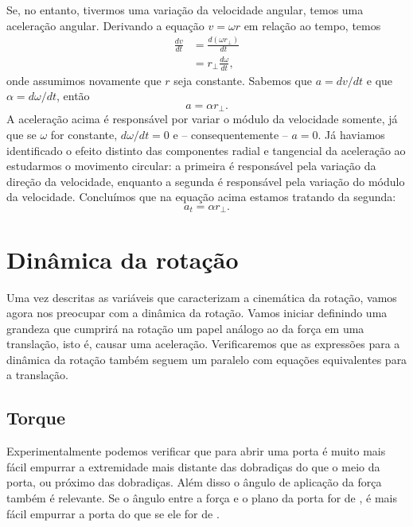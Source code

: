 Se, no entanto, tivermos uma variação da velocidade angular, temos uma aceleração angular. Derivando a equação $v = \omega r$ em relação ao tempo, temos
\begin{align}
	\frac{dv}{dt} &= \frac{d(\omega r_\perp)}{dt} \\
	&=r_\perp \frac{d\omega}{dt},
\end{align}
%
onde assumimos novamente que $r$ seja constante. Sabemos que $a=dv/dt$ e que $\alpha = d\omega/dt$, então
\begin{equation}
	a = \alpha r_\perp.
\end{equation}
%
A aceleração acima é responsável por variar o módulo da velocidade somente, já que se $\omega$ for constante, $d\omega/dt = 0$ e -- consequentemente -- $a=0$. Já haviamos identificado o efeito distinto das componentes radial e tangencial da aceleração ao estudarmos o movimento circular: a primeira é responsável pela variação da direção da velocidade, enquanto a segunda é responsável pela variação do módulo da velocidade. Concluímos que na equação acima estamos tratando da segunda:
\begin{equation}
	a_t = \alpha r_\perp.
\end{equation}

\section{Dinâmica da rotação}

Uma vez descritas as variáveis que caracterizam a cinemática da rotação, vamos agora nos preocupar com a dinâmica da rotação. Vamos iniciar definindo uma grandeza que cumprirá na rotação um papel análogo ao da força em uma translação, isto é, causar uma aceleração. Verificaremos que as expressões para a dinâmica da rotação também seguem um paralelo com equações equivalentes para a translação.

\subsection{Torque}

Experimentalmente podemos verificar que para abrir uma porta é muito mais fácil empurrar a extremidade mais distante das dobradiças do que o meio da porta, ou próximo das dobradiças. Além disso o ângulo de aplicação da força também é relevante. Se o ângulo entre a força e o plano da porta for de , é mais fácil empurrar a porta do que se ele for de .

